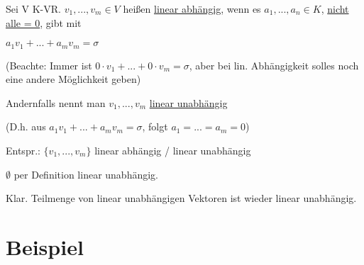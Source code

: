 \documentclass[a4paper, openany]{book}
\begin{document}
    Sei V K-VR. $v_1, ..., v_m \in V$ heißen \underline{linear abhängig}, wenn es $a_1, ..., a_n \in K$, \underline{nicht alle = 0}, gibt mit

    $a_1v_1+...+a_mv_m = \sigma$

    (Beachte: Immer ist $0 \cdot v_1 +...+0 \cdot v_m = \sigma$, aber bei lin. Abhängigkeit solles noch eine andere Möglichkeit geben)

    Andernfalls nennt man $v_1, ..., v_m$ \underline{linear unabhängig}

    (D.h. aus $a_1v_1 + ... + a_mv_m = \sigma$, folgt $a_1 = ... = a_m = 0$)

    \par \medskip

    Entspr.: $\{v_1,...,v_m\}$ linear abhängig / linear unabhängig

    $\emptyset$ per Definition linear unabhängig.

    Klar. Teilmenge von linear unabhängigen Vektoren ist wieder linear unabhängig.

    \section{Beispiel}
\end{document}
